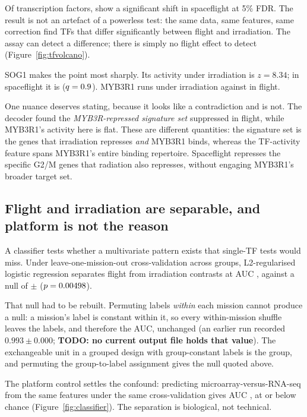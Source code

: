 Of \NumTFsTested{} transcription factors, \textbf{\NumTFsSigFlight{}} show a significant
shift in spaceflight at 5\% FDR. The result is not an artefact of a powerless test: the
same data, same features, same correction find \NumTFsSigFlightVsRad{} TFs that differ
significantly between flight and irradiation. The assay can detect a difference; there is
simply no flight effect to detect (Figure~\ref{fig:tfvolcano}).

SOG1 makes the point most sharply. Its activity under irradiation is $z = 8.34$; in
spaceflight it is \SogFlightZ{} ($q = 0.9{}$). MYB3R1 runs \MybRadZ{} under
irradiation against \MybFlightZ{} in flight.

One nuance deserves stating, because it looks like a contradiction and is not. The decoder
found the \emph{MYB3R-repressed signature set} suppressed in flight, while MYB3R1's
activity here is flat. These are different quantities: the signature set is the
\NumSignatureMybRep{} genes that irradiation represses \emph{and} MYB3R1 binds, whereas the
TF-activity feature spans MYB3R1's entire binding repertoire. Spaceflight represses the
specific G2/M genes that radiation also represses, without engaging MYB3R1's broader
target set.

\subsection{Flight and irradiation are separable, and platform is not the reason}

A classifier tests whether a multivariate pattern exists that single-TF tests would miss.
Under leave-one-mission-out cross-validation across \ClfGroups{} groups, L2-regularised
logistic regression separates flight from irradiation contrasts at
AUC \ClfAUC{}, against a null of \ClfNullMean{} $\pm$ \ClfNullSD{}
($p = 0.00498{}$).

That null had to be rebuilt. Permuting labels \emph{within} each mission cannot produce a
null: a mission's label is constant within it, so every within-mission shuffle leaves the
labels, and therefore the AUC, unchanged (an earlier run recorded $0.993 \pm 0.000$;
\textbf{TODO: no current output file holds that value}). The exchangeable unit in
a grouped design with group-constant labels is the group, and permuting the group-to-label
assignment gives the null quoted above.

The platform control settles the confound: predicting microarray-versus-RNA-seq from the
same features under the same cross-validation gives AUC \ClfPlatformAUC{}, at or below
chance (Figure~\ref{fig:classifier}). The separation is biological, not technical.

